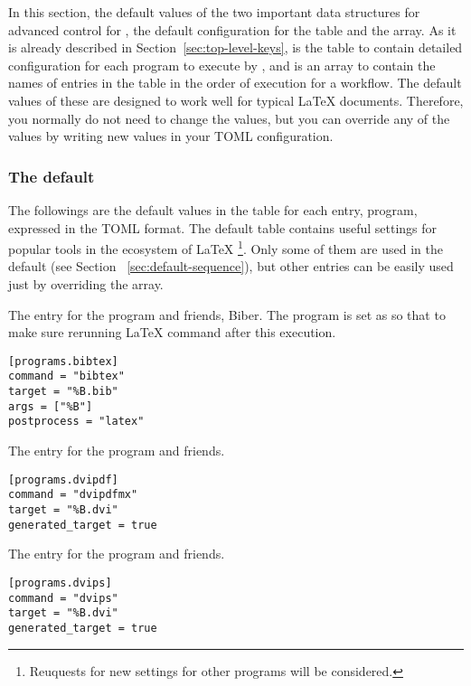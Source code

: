 \documentclass[draft]{llmk-doc}
\begin{document}
In this section, the default values of the two important data structures for
advanced control for , \ie the default configuration for the
 table and the  array. As it is already described
in Section~\ref{sec:top-level-keys},  is the table to contain
detailed configuration for each program to execute by , and
 is an array to contain the names of entries in the
 table in the order of execution for a workflow. The default
values of these are designed to work well for typical {\LaTeX} documents.
Therefore, you normally do not need to change the values, but you can override
any of the values by writing new values in your TOML configuration.

\subsubsection{The default }
\label{sec:default-programs}

The followings are the default values in the  table for each
entry, \ie program, expressed in the TOML format. The default 
table contains useful settings for popular tools in the ecosystem of {\LaTeX}%
\footnote{Reuquests for new settings for other programs will be considered.}.
Only some of them are used in the default  (see Section~%
\ref{sec:default-sequence}), but other entries can be easily used just by
overriding the  array.

 The entry for the {\BibTeX} program and friends, \eg Biber.
The  program is set as  so that to make sure
rerunning {\LaTeX} command after this execution.
%
\begin{lstlisting}[style=toml]
[programs.bibtex]
command = "bibtex"
target = "%B.bib"
args = ["%B"]
postprocess = "latex"
\end{lstlisting}

 The entry for the  program and friends.
%
\begin{lstlisting}[style=toml]
[programs.dvipdf]
command = "dvipdfmx"
target = "%B.dvi"
generated_target = true
\end{lstlisting}

 The entry for the  program and friends.
%
\begin{lstlisting}[style=toml]
[programs.dvips]
command = "dvips"
target = "%B.dvi"
generated_target = true
\end{lstlisting}
\end{document}
